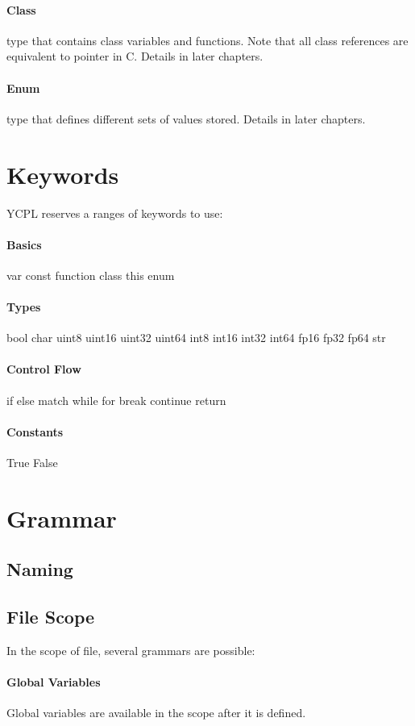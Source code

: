 \documentclass[12pt, a4paper]{IEEEtran}
\begin{document}
	\paragraph{Class} type that contains class variables and functions. Note that all class references are equivalent to pointer in C. Details in later chapters.
	\paragraph{Enum} type that defines different sets of values stored. Details in later chapters.

\section{Keywords}
	YCPL reserves a ranges of keywords to use:
	
	\paragraph{Basics} var const function class this enum
	\paragraph{Types} bool char uint8 uint16 uint32 uint64 int8 int16 int32 int64 fp16 fp32 fp64 str
	\paragraph{Control Flow} if else match while for break continue return
	\paragraph{Constants} True False
	
\section{Grammar}
\subsection{Naming}
\subsection{File Scope}
In the scope of file, several grammars are possible:
\paragraph{Global Variables}
Global variables are available in the scope after it is defined.
\end{document}
